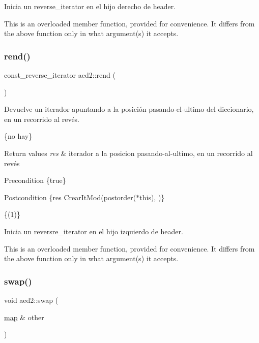 Inicia un reverse\+\_\+iterator en el hijo derecho de header.

This is an overloaded member function, provided for convenience. It differs from the above function only in what argument(s) it accepts. \mbox{\label{namespaceaed2_a161376ee8d17855224ab722ff9e0dd9a}} 
\subsubsection{\texorpdfstring{rend()}{rend()}}
{\footnotesize\ttfamily const\+\_\+reverse\+\_\+iterator aed2\+::rend (\begin{DoxyParamCaption}{ }\end{DoxyParamCaption})}



Devuelve un iterador apuntando a la posición pasando-\/el-\/ultimo del diccionario, en un recorrido al revés. 

\{no hay\}


\begin{DoxyRetVals}{Return values}
{\em res} & iterador a la posicion pasando-\/al-\/ultimo, en un recorrido al revés\\
\hline
\end{DoxyRetVals}
\begin{DoxyPrecond}{Precondition}
\{true\} 
\end{DoxyPrecond}
\begin{DoxyPostcond}{Postcondition}
\{res  Crear\+It\+Mod(postorder($\ast$this),  )\}
\end{DoxyPostcond}
\{(1)\}

Inicia un reversre\+\_\+iterator en el hijo izquierdo de header.

This is an overloaded member function, provided for convenience. It differs from the above function only in what argument(s) it accepts. \mbox{\label{namespaceaed2_ab24ac4be44835194ce27a61969e4a292}} 
\subsubsection{\texorpdfstring{swap()}{swap()}}
{\footnotesize\ttfamily void aed2\+::swap (\begin{DoxyParamCaption}\item[{\hyperlink{classaed2_1_1map}{map} \&}]{other }\end{DoxyParamCaption})}



